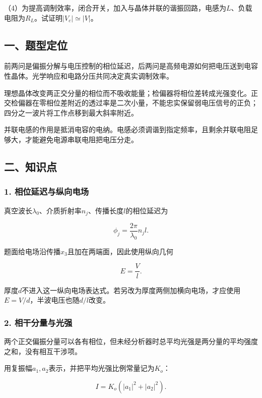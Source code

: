 \documentclass[12pt,a4paper,fontset=fandol]{ctexart}
\begin{document}
（4）为提高调制效率，闭合开关，加入与晶体并联的谐振回路，电感为\(L\)、负载电阻为\(R_L\)。试证明\(|V_c|\simeq|V|\)。

\subsection{一、题型定位}\label{ux4e00ux9898ux578bux5b9aux4f4d-7}

前两问是偏振分解与电压控制的相位延迟，后两问是高频电源如何把电压送到电容性晶体。光学响应和电路分压共同决定真实调制效率。

理想晶体改变两正交分量的相位而不吸收能量；检偏器将相位差转成光强变化。正交检偏器在零相位差附近的透过率是二次小量，不能忠实保留弱电压信号的正负；四分之一波片将工作点移到最大斜率附近。

并联电感的作用是抵消电容的电纳。电感必须调谐到指定频率，且剩余并联电阻足够大，才能避免电源串联电阻把电压分走。

\subsection{二、知识点}\label{ux4e8cux77e5ux8bc6ux70b9-7}

\subsubsection{1.
相位延迟与纵向电场}\label{ux76f8ux4f4dux5ef6ux8fdfux4e0eux7eb5ux5411ux7535ux573a}

真空波长\(\lambda_0\)、介质折射率\(n_j\)、传播长度\(l\)的相位延迟为

\[
\phi_j=\frac{2\pi}{\lambda_0}n_jl.
\]

题面给电场沿传播\(x_3\)且加在两端面，因此使用纵向几何

\[
E=\frac Vl.
\]

厚度\(d\)不进入这一纵向电场表达式。若另改为厚度两侧加横向电场，才应使用\(E=V/d\)，半波电压也随\(d/l\)改变。

\subsubsection{2.
相干分量与光强}\label{ux76f8ux5e72ux5206ux91cfux4e0eux5149ux5f3a}

两个正交偏振分量可以各有相位，但未经分析器时总平均光强是两分量的平均强度之和，没有相互干涉项。

用复振幅\(a_1,a_2\)表示，并把平均光强比例常量记为\(K_o\)：

\[
I=K_o(|a_1|^2+|a_2|^2).
\]
\end{document}
